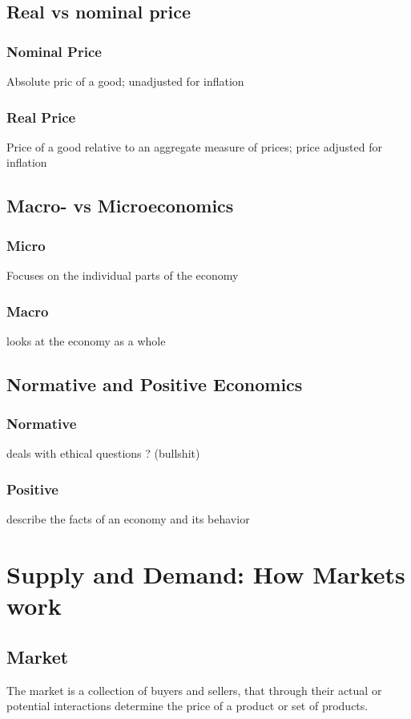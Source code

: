 \documentclass[a4paper,titlepage] {scrartcl}
\begin{document}
\subsection{Real vs nominal price}
\label{sub:realVsNominal}
\subsubsection{Nominal Price}
Absolute pric of a good; unadjusted for inflation
\subsubsection{Real Price}
Price of a good relative to an aggregate measure of prices; price adjusted for inflation

\subsection{Macro- vs Microeconomics}
\subsubsection{Micro}
Focuses on the individual parts of the economy
\subsubsection{Macro}
looks at the economy as a whole

\subsection{Normative and Positive Economics}
\subsubsection{Normative}
deals with ethical questions ? (bullshit)
\subsubsection{Positive}
describe the facts of an economy and its behavior


\section{Supply and Demand: How Markets work}
\subsection{Market}
The market is a collection of buyers and sellers, that through their actual or potential interactions determine the price of a product or set of products. 
\end{document}
